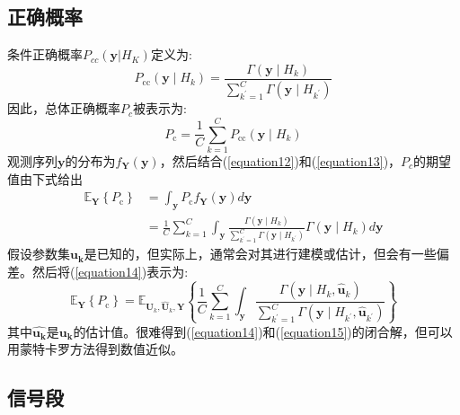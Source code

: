 \documentclass[final]{cvpr}
\begin{document}
\subsection{正确概率}\label{sec:CorrectPro}

条件正确概率$P_{cc}(\mathbf{y}|H_K)$定义为:
\begin{equation}
P_{\mathrm{cc}}\left(\mathbf{y} \mid H_{k}\right)=\frac{\Gamma\left(\mathbf{y} \mid H_{k}\right)}{\sum_{k^{\prime}=1}^{C} \Gamma\left(\mathbf{y} \mid H_{k^{\prime}}\right)}\label{equation12}
\end{equation}
因此，总体正确概率$P_c$被表示为:
\begin{equation}
P_{\mathrm{c}}=\frac{1}{C} \sum_{k=1}^{C} P_{\mathrm{cc}}\left(\mathbf{y} \mid H_{k}\right)\label{equation13}
\end{equation}
观测序列$\mathbf{y}$的分布为$f_\mathbf{Y}(\mathbf{y})$，然后结合(\ref{equation12})和(\ref{equation13})，$P_c$的期望值由下式给出
\begin{equation}
\begin{aligned}
\mathbb{E}_{\mathbf{Y}}\left\{P_{\mathrm{c}}\right\} &=\int_{\mathbf{y}} P_{\mathrm{c}} f_{\mathbf{Y}}(\mathbf{y}) d \mathbf{y} \\
&=\frac{1}{C} \sum_{k=1}^{C} \int_{\mathbf{y}} \frac{\Gamma\left(\mathbf{y} \mid H_{k}\right)}{\sum_{k^{\prime}=1}^{C} \Gamma\left(\mathbf{y} \mid H_{k^{\prime}}\right)} \Gamma\left(\mathbf{y} \mid H_{k}\right) d \mathbf{y} \label{equation14}
\end{aligned}
\end{equation}
假设参数集$\mathbf{u_k}$是已知的，但实际上，通常会对其进行建模或估计，但会有一些偏差。然后将(\ref{equation14})表示为:
\begin{equation}
\mathbb{E}_{\mathbf{Y}}\left\{P_{\mathrm{c}}\right\}=\mathbb{E}_{\mathbf{U}_{k}, \hat{\mathbf{U}}_{k}, \mathbf{Y}}\left\{\frac{1}{C} \sum_{k=1}^{C} \int_{\mathbf{y}} \frac{\Gamma\left(\mathbf{y} \mid H_{k}, \hat{\mathbf{u}}_{k}\right)}{\sum_{k^{\prime}=1}^{C} \Gamma\left(\mathbf{y} \mid H_{k^{\prime}}, \hat{\mathbf{u}}_{k^{\prime}}\right)}\right\}\label{equation15}
\end{equation}
其中$\widehat{\mathbf{u_k}}$是$\mathbf{u_k}$的估计值。很难得到(\ref{equation14})和(\ref{equation15})的闭合解，但可以用蒙特卡罗方法得到数值近似。
\subsection{信号段}\label{sec:SignalSeg}
\end{document}
